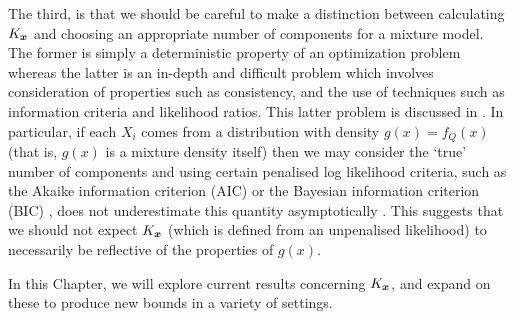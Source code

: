 	The third, is that we should be careful to make a distinction between calculating $K_{\bm{{x}}}$ and choosing an appropriate number of components for a mixture model. The former is simply a deterministic property of an optimization problem whereas the latter is an in-depth and difficult problem which involves consideration of properties such as consistency, and the use of techniques such as information criteria and likelihood ratios. This latter problem is discussed in \cite[Chapter 6]{McLachlan2004-ik}. In particular, if each $X_i$ comes from a distribution with density $g(x) = f_Q(x)$ (that is, $g(x)$ is a mixture density itself) then we may consider the `true' number of components and using certain penalised log likelihood criteria, such as the Akaike information criterion (AIC) \cite{Akaike1974-bl} or the Bayesian information criterion (BIC) \cite{Schwarz1978-ci}, does not underestimate this quantity asymptotically \cite{Leroux1992-ek}. This suggests that we should not expect $K_{\bm{{x}}}$ (which is defined from an unpenalised likelihood) to necessarily be reflective of the properties of $g(x)$.

	In this Chapter, we will explore current results concerning $K_{\bm{{x}}}$, and expand on these to produce new bounds in a variety of settings. 
 


	
